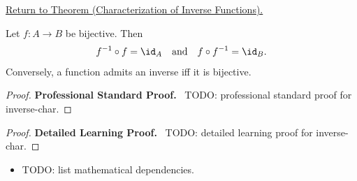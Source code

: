 \newpage
{}
\label{prf:inverse-char}

\begin{remark*}[Return]
\hyperref[thm:inverse-char]{Return to Theorem (Characterization of Inverse Functions).}
\end{remark*}

\begin{theorem*}
Let $f : A \to B$ be bijective. Then
\[
f^{-1} \circ f = \id_A
\quad\text{and}\quad
f \circ f^{-1} = \id_B.
\]
Conversely, a function admits an inverse iff it is bijective.
\end{theorem*}

\begin{proof}
\textbf{Professional Standard Proof.}~
TODO: professional standard proof for inverse-char.
\end{proof}

\begin{proof}
\textbf{Detailed Learning Proof.}~
TODO: detailed learning proof for inverse-char.
\end{proof}

\begin{remark*}
\end{remark*}

\begin{dependencies}
\begin{itemize}
  \item TODO: list mathematical dependencies.
\end{itemize}
\end{dependencies}

\clearpage
